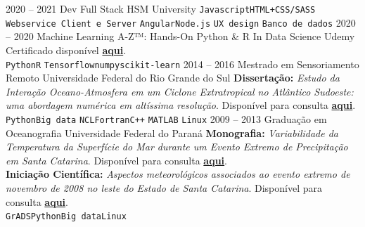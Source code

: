 \documentclass[9pt]{developercv} %
\begin{document}
\begin{entrylist}
		\entry
		{2020 -- 2021}
		{Dev Full Stack}
		{HSM University}
		{ \texttt{Javascript}\slashsep\texttt{HTML+CSS/SASS} \slashsep\texttt{Webservice Client e Server} \slashsep\texttt{Angular}\slashsep\texttt{Node.js} \slashsep\texttt{UX design} \slashsep\texttt{Banco de dados} }
		\entry
		{2020 -- 2020}
		{Machine Learning A-Z™: Hands-On Python \& R In Data Science}
		{Udemy}
		{Certificado disponível \href{https://www.udemy.com/certificate/UC-06fff362-ee67-467b-a658-df37cfef5368/}{\textcolor{bleu_cite}{\textbf{aqui}}}. \\ \texttt{Python}\slashsep\texttt{R} \slashsep\texttt{Tensorflow}\slashsep\texttt{numpy}\slashsep\texttt{scikit-learn} }
		\entry
		{2014 -- 2016}
		{Mestrado em Sensoriamento Remoto}
		{Universidade Federal do Rio Grande do Sul}
		{\textbf{Dissertação:} \textit{Estudo da Interação Oceano-Atmosfera em um Ciclone Extratropical no Atlântico Sudoeste: uma abordagem numérica em altíssima resolução}. Disponível para consulta \href{https://lume.ufrgs.br/handle/10183/171223}{\textcolor{bleu_cite}{\textbf{aqui}}}. \\  \texttt{Python}\slashsep\texttt{Big data} \slashsep\texttt{NCL}\slashsep\texttt{Fortran}\slashsep\texttt{C++} \slashsep\texttt{MATLAB} \slashsep\texttt{Linux}    }
	\entry
		{2009 -- 2013}
		{Graduação em Oceanografia}
		{Universidade Federal do Paraná}
		{\textbf{Monografia:} \textit{Variabilidade da Temperatura da Superfície do Mar durante um Evento Extremo de Precipitação em Santa Catarina}. Disponível para consulta \href{http://doi.org/10.13140/RG.2.2.15184.35847}{\textcolor{bleu_cite}{\textbf{aqui}}}. 
		\\ \textbf{Iniciação Científica: } \textit{Aspectos meteorológicos associados ao evento extremo de novembro de 2008 no leste do Estado de Santa Catarina}. Disponível para consulta \href{http://doi.org/10.13140/RG.2.2.25250.68800}{\textcolor{bleu_cite}{\textbf{aqui}}}.
		\\\texttt{GrADS}\slashsep\texttt{Python}\slashsep\texttt{Big data}\slashsep\texttt{Linux}}
\end{entrylist}

\vspace{-0.4cm}
\end{document}

